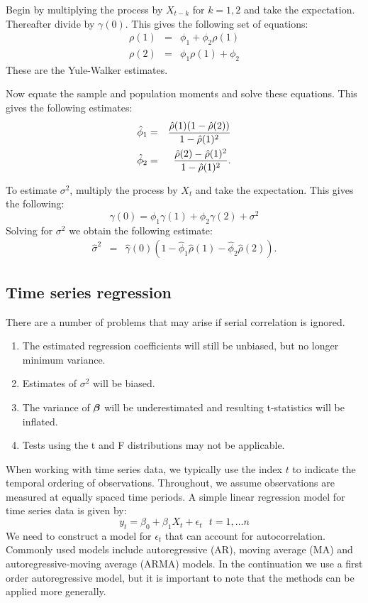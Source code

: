 Begin by multiplying the process by $X_{t-k}$ for $k=1,2$ and take the expectation. Thereafter divide by $\gamma(0)$.
This gives the following set of equations:
\begin{eqnarray*}
\rho(1) &=& \phi_1 + \phi_2 \rho(1) \\
\rho(2) &=& \phi_1 \rho(1) + \phi_2  
\end{eqnarray*}
These are the Yule-Walker estimates.

Now equate the sample and population moments and solve these equations.
This gives the following estimates:
\begin{eqnarray*}
\hat \phi_1 &=& \frac{\hat \rho(1) (1 - \hat \rho(2))}{1 - \hat \rho(1)^2} \\
\vb
\hat \phi_2 &=& \frac{\hat \rho(2) - \hat \rho(1)^2}{1 - \hat \rho(1)^2} .
\end{eqnarray*}

To estimate $\sigma^2$, multiply the process by $X_{t}$ and take the expectation.
This gives the following:
$$
\gamma(0) = \phi_1 \gamma(1) + \phi_2 \gamma(2) + \sigma^2
$$
Solving for $\sigma^2$ we obtain the following estimate:
\begin{eqnarray*}
\hat \sigma^2 &=& \hat \gamma(0)(1 - \hat \phi_1 \hat \rho(1) - \hat \phi_2 \hat \rho(2)).
\end{eqnarray*}



\subsection{Time series regression}


There are a number of problems that may arise if serial correlation is ignored. 
\begin{enumerate}
\item The estimated regression coefficients will still be unbiased, but no longer minimum variance.
\item Estimates of $\sigma^2$ will be biased.
\item The variance of $\mbox{\boldmath $\beta$}$ will be underestimated and resulting t-statistics will be inflated.
\item Tests using the t and F distributions may not be applicable.
\end{enumerate}

When working with time series data, we typically use the index $t$ to indicate the temporal ordering of observations.
Throughout, we assume observations are measured at equally spaced time periods.
A simple linear regression model for time series data is given by: 
$$y_t = \beta_0 + \beta_1 X_t + \epsilon_t \,\,\,\, t=1,\ldots n
$$
We need to construct a model for $\epsilon_t$ that can account for autocorrelation. 
Commonly used models include autoregressive (AR), moving average (MA) and autoregressive-moving average (ARMA) models.
In the continuation we use a first order autoregressive model, but it is important to note that the methods can be applied more generally.

